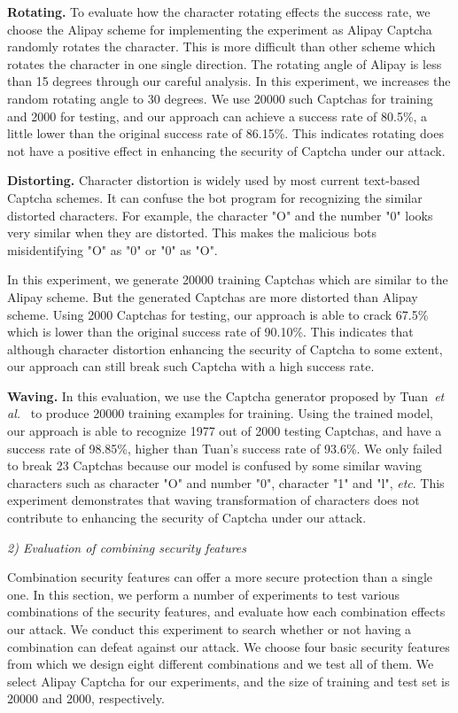 \textbf{Rotating.} To evaluate how the character rotating effects the success rate, we choose the Alipay scheme for implementing the experiment as Alipay Captcha randomly rotates the character. This is more difficult than other scheme which rotates the character in one single direction. The rotating angle of Alipay is less than 15 degrees through our careful analysis. In this experiment, we increases the random rotating angle to 30 degrees. We use 20000 such Captchas for training and 2000 for testing, and our approach can achieve a success rate of 80.5\%, a little lower than the original success rate of 86.15\%. This indicates rotating does not have a positive effect in enhancing the security of Captcha under our attack.

\textbf{Distorting.} Character distortion is widely used by most current text-based Captcha schemes. It can confuse the bot program for recognizing the similar distorted characters. For example, the character "O" and the number "0" looks very similar when they are distorted. This makes the malicious bots misidentifying "O" as "0" or "0" as "O".

In this experiment, we generate 20000 training Captchas which are similar to the Alipay scheme. But the generated Captchas are more distorted than Alipay scheme. Using 2000 Captchas for testing, our approach is able to crack 67.5\% which is lower than the original success rate of 90.10\%. This indicates that although character distortion enhancing the security of Captcha to some extent, our approach can still break such Captcha with a high success rate.

\textbf{Waving.} In this evaluation, we use the Captcha generator proposed by Tuan~\emph{et al.}~\cite{Le2017Using} to produce 20000 training examples for training. Using the trained model, our approach is able to recognize 1977 out of 2000 testing Captchas, and have a success rate of 98.85\%, higher than Tuan's success rate of 93.6\%. We only failed to break 23 Captchas because our model is confused by some similar waving characters such as character "O" and number "0", character "1" and "l", \emph{etc}.  This experiment demonstrates that waving transformation of characters does not contribute to enhancing the security of Captcha under our attack.


\noindent \emph{2) Evaluation of combining security features}

Combination security features can offer a more secure protection than a single one. In this section, we perform a number of experiments to test various combinations of the security features, and evaluate how each combination effects our attack. We conduct this experiment to search whether or not having a combination can defeat against our attack. We choose four basic security features from which we design eight different combinations and we test all of them. We select Alipay Captcha for our experiments, and the size of training and test set is 20000 and 2000, respectively.

